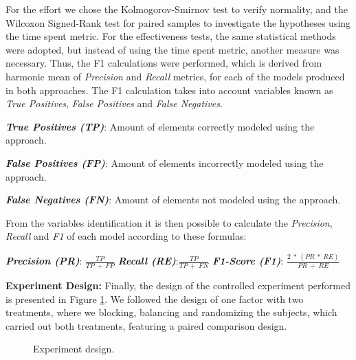 For the effort we chose the Kolmogorov-Smirnov test to verify normality, and the Wilcoxon Signed-Rank test for paired samples to investigate the hypotheses using the time spent metric.
For the effectiveness tests, the same statistical methods were adopted, but instead of using the time spent metric, another measure was necessary.
Thus, the F1 calculations were performed, which is derived from harmonic mean of \textit{Precision} and \textit{Recall} metrics, for each of the models produced in both approaches.
The F1 calculation \cite{Derczynski:2016} takes into account variables known as \textit{True Positives}, \textit{False Positives} and \textit{False Negatives}.
\begin{description}
    \item \textbf{\textit{True Positives (TP)}}: Amount of elements correctly modeled using the approach.
    \item \textbf{\textit{False Positives (FP)}}: Amount of elements incorrectly modeled using the approach. 
    \item \textbf{\textit{False Negatives (FN)}}: Amount of elements not modeled using the approach.
\end{description}
From the variables identification it is then possible to calculate the \textit{Precision}, \textit{Recall} and \textit{F1} of each model according to these formulas:
\begin{description}
    \item \textbf{\textit{Precision (PR)}}: $\frac{TP}{TP~+~FP}$ 
    \hfill 
    \textbf{\textit{Recall (RE)}}:$\frac{TP}{TP~+~FN}$
    \hfill
    \textbf{\textit{F1-Score (F1)}}: $\frac{2~*~(PR~*~ RE)}{PR~+~RE}$
\end{description}

\textbf{Experiment Design:} Finally, the design of the controlled experiment performed is presented in Figure \ref{fig:designExp}. 
We followed the design of one factor with two treatments, where we blocking, balancing and randomizing the subjects, which carried out both treatments, featuring a paired comparison design.

\begin{figure}[!htb]
    \centering
    
    \caption{Experiment design.}
    \label{fig:designExp}
\end{figure}

